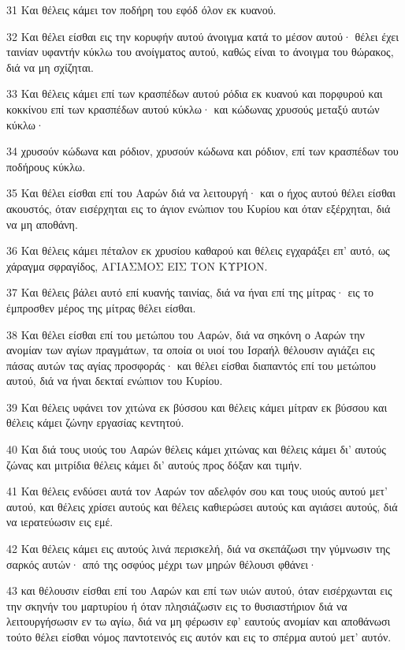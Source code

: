\par 31 Και θέλεις κάμει τον ποδήρη του εφόδ όλον εκ κυανού.
\par 32 Και θέλει είσθαι εις την κορυφήν αυτού άνοιγμα κατά το μέσον αυτού· θέλει έχει ταινίαν υφαντήν κύκλω του ανοίγματος αυτού, καθώς είναι το άνοιγμα του θώρακος, διά να μη σχίζηται.
\par 33 Και θέλεις κάμει επί των κρασπέδων αυτού ρόδια εκ κυανού και πορφυρού και κοκκίνου επί των κρασπέδων αυτού κύκλω· και κώδωνας χρυσούς μεταξύ αυτών κύκλω·
\par 34 χρυσούν κώδωνα και ρόδιον, χρυσούν κώδωνα και ρόδιον, επί των κρασπέδων του ποδήρους κύκλω.
\par 35 Και θέλει είσθαι επί του Ααρών διά να λειτουργή· και ο ήχος αυτού θέλει είσθαι ακουστός, όταν εισέρχηται εις το άγιον ενώπιον του Κυρίου και όταν εξέρχηται, διά να μη αποθάνη.
\par 36 Και θέλεις κάμει πέταλον εκ χρυσίου καθαρού και θέλεις εγχαράξει επ' αυτό, ως χάραγμα σφραγίδος, ΑΓΙΑΣΜΟΣ ΕΙΣ ΤΟΝ ΚΥΡΙΟΝ.
\par 37 Και θέλεις βάλει αυτό επί κυανής ταινίας, διά να ήναι επί της μίτρας· εις το έμπροσθεν μέρος της μίτρας θέλει είσθαι.
\par 38 Και θέλει είσθαι επί του μετώπου του Ααρών, διά να σηκόνη ο Ααρών την ανομίαν των αγίων πραγμάτων, τα οποία οι υιοί του Ισραήλ θέλουσιν αγιάζει εις πάσας αυτών τας αγίας προσφοράς· και θέλει είσθαι διαπαντός επί του μετώπου αυτού, διά να ήναι δεκταί ενώπιον του Κυρίου.
\par 39 Και θέλεις υφάνει τον χιτώνα εκ βύσσου και θέλεις κάμει μίτραν εκ βύσσου και θέλεις κάμει ζώνην εργασίας κεντητού.
\par 40 Και διά τους υιούς του Ααρών θέλεις κάμει χιτώνας και θέλεις κάμει δι' αυτούς ζώνας και μιτρίδια θέλεις κάμει δι' αυτούς προς δόξαν και τιμήν.
\par 41 Και θέλεις ενδύσει αυτά τον Ααρών τον αδελφόν σου και τους υιούς αυτού μετ' αυτού, και θέλεις χρίσει αυτούς και θέλεις καθιερώσει αυτούς και αγιάσει αυτούς, διά να ιερατεύωσιν εις εμέ.
\par 42 Και θέλεις κάμει εις αυτούς λινά περισκελή, διά να σκεπάζωσι την γύμνωσιν της σαρκός αυτών· από της οσφύος μέχρι των μηρών θέλουσι φθάνει·
\par 43 και θέλουσιν είσθαι επί του Ααρών και επί των υιών αυτού, όταν εισέρχωνται εις την σκηνήν του μαρτυρίου ή όταν πλησιάζωσιν εις το θυσιαστήριον διά να λειτουργήσωσιν εν τω αγίω, διά να μη φέρωσιν εφ' εαυτούς ανομίαν και αποθάνωσι τούτο θέλει είσθαι νόμος παντοτεινός εις αυτόν και εις το σπέρμα αυτού μετ' αυτόν.

